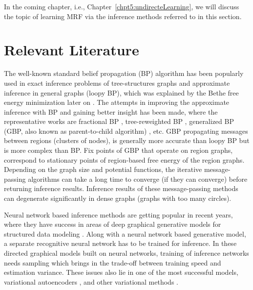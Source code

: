 In the coming chapter, i.e., Chapter~\ref{chpt5:undirecteLearning}, we will discuss the topic of learning MRF via the inference methods referred to in this section.

\section{Relevant Literature}\label{chpt4:sec:literature}

The well-known standard belief propagation (BP) algorithm \cite{Pearl1982reverend,kschischang2001factor_graph} has been popularly used in exact inference problems of tree-structures graphs and approximate inference in general graphs (loopy BP), which was explained by the Bethe free energy minimization later on \cite{yedidia2003understanding}. The attempts in improving the approximate inference with BP and gaining better insight has been made, where the representative works are fractional BP \cite{Wiegerinck:2002:FBP:2968618.2968673}, tree-reweighted BP \cite{wainwright2008graphical}, generalized BP (GBP, also known as parent-to-child algorithm) \cite{Yedidia:2000:GBP:3008751.3008848, yedida2005constucting}, etc. 
GBP propagating messages between regions (clusters of nodes), is generally more accurate than loopy BP but is more complex than BP. Fix points of GBP that operate on region graphs, correspond to stationary points of region-based free energy of the region graphs. Depending on the graph size and potential functions, the iterative message-passing algorithms can take a long time to converge (if they can converge) before returning inference results. Inference results of these message-passing methods can degenerate significantly in dense graphs (graphs with too many circles).

Neural network based inference methods are getting popular in recent years, where they have success in areas of deep graphical generative models for structured data modeling \cite{qu2019gmnn, johansonNIPS2016_6379, li2018graphical}. Along with a neural network based generative model, a separate recognitive neural network has to be trained for inference. In these directed graphical models built on neural networks, training of inference networks needs sampling which brings in the trade-off between training speed and estimation variance. These issues also lie in one of the most successful models, variational autoencoders \cite{DBLP:journals/corr/KingmaW13,2017arXiv170104722M, 2017arXiv171101558T}, and other variational methods \cite{kuleshov2017neural_variational, dustin2017hierarchical, domke2019provable, hernandez-lobatob16}.


